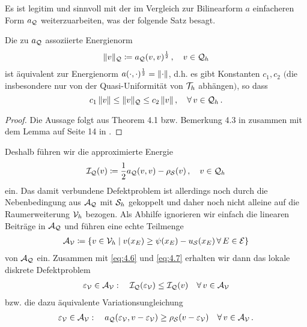 Es ist legitim und sinnvoll mit der im Vergleich zur Bilinearform $a$ einfacheren Form $a_{\mathcal Q}$ weiterzuarbeiten, was  der folgende Satz besagt.


\begin{satz}\label{satz:4.8}
Die zu $a_{\mathcal Q}$ assoziierte Energienorm
\begin{align*}
	\lVert v\rVert_{\mathcal Q}\coloneqq a_{\mathcal Q}(v,v)^{\frac 1 2} \, , \quad v \in \mathcal Q_h
\end{align*}
ist äquivalent zur Energienorm $a(\cdot,\cdot)^{\frac 12} = \lVert \cdot\rVert$, d.h. es gibt Konstanten $c_1,c_2$ $($die insbesondere nur von der Quasi-Uniformität von $\mathcal T_h$ abhängen$)$, so dass
\[
	c_1 \, \lVert v\rVert \le \lVert v\rVert_{\mathcal Q} \le c_2 \, \lVert v\rVert \, , \quad \forall \, v \in \mathcal Q_h \, .
\]
\end{satz}

\begin{proof}
Die Aussage folgt aus Theorem 4.1 bzw. Bemerkung 4.3 in \cite{HoppeKorn} zusammen mit dem Lemma auf Seite 14 in \cite{Deufl}.
\end{proof}


Deshalb führen wir die approximierte Energie
\begin{align}\label{eq:4.6}
	\mathcal I_{\mathcal Q} (v) \coloneqq \frac 1 2 a_{\mathcal Q}(v,v)-\rho_{\mathcal S}(v) \, , \quad v \in \mathcal Q_h 
\end{align}
ein. Das damit verbundene Defektproblem ist allerdings noch durch die Nebenbedingung aus $\mathcal A_{\mathcal Q}$ mit $\mathcal S_h$ gekoppelt und daher noch nicht alleine auf die Raumerweiterung $\mathcal V_h$ bezogen. Als Abhilfe ignorieren wir einfach die linearen Beiträge in $\mathcal A_{\mathcal Q}$ und führen eine echte Teilmenge 
\begin{align}\label{eq:4.7}
	\mathcal A_{\mathcal V} \coloneqq \{v \in \mathcal V_h \mid v(x_E) \ge \psi(x_E)-u_{\mathcal S}(x_E) \, \forall \, E \in \mathcal E\}
\end{align}
von $\mathcal A_{\mathcal Q}$ ein. Zusammen mit \eqref{eq:4.6} und \eqref{eq:4.7} erhalten wir dann das lokale diskrete Defektproblem
\begin{align}\label{eq:4.8}
	\varepsilon_{\mathcal V} \in \mathcal A_{\mathcal V} : \quad \mathcal I_{\mathcal Q}(\varepsilon_{\mathcal V}) \le \mathcal I_{\mathcal Q} (v) \quad \forall \, v \in \mathcal A_{\mathcal V}
\end{align}
bzw. die dazu äquivalente Variationsungleichung
\begin{align}\label{eq:4.9}
	\varepsilon_{\mathcal V} \in \mathcal A_{\mathcal V} : \quad a_{\mathcal Q} (\varepsilon_{\mathcal V},v-\varepsilon_{\mathcal V})\ge \rho_{\mathcal S} (v-\varepsilon_{\mathcal V}) \quad \forall \, v \in \mathcal A_{\mathcal V} \, .
\end{align}


